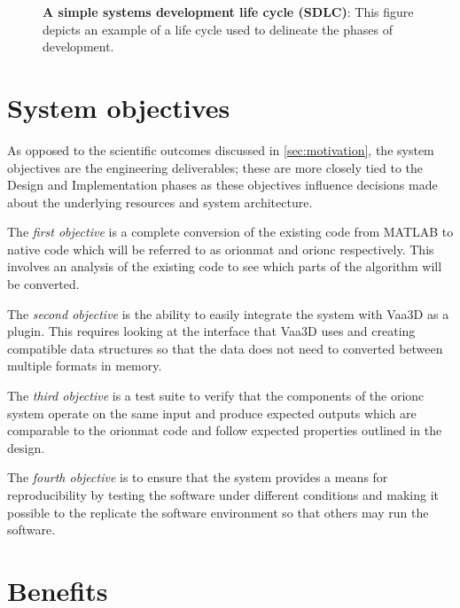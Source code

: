 \begin{figure}[tbp]
\centering

\caption[Systems development life cycle]%
	{\textbf{A simple systems development life cycle (SDLC)}: This figure
	depicts an example of a life cycle used to delineate the
	phases of development.
}\label{fig:sdlc}
\end{figure}

\section{System objectives}\label{sec:objectives}

As opposed to the scientific outcomes discussed in \cref{sec:motivation},
the system objectives are the engineering
deliverables; these are more closely tied to the Design and Implementation
phases as these objectives influence decisions made about the underlying
resources and system architecture.

The \emph{first objective} is a complete conversion of the
existing code from MATLAB to native code which will be referred to
as \gls{orionmat} and \gls{orionc} respectively. This involves an
analysis of the existing code to see which parts of the algorithm will be converted.

The \emph{second objective} is the ability to easily integrate the system with
Vaa3D as a plugin. This requires looking at the interface that
Vaa3D uses and creating compatible data structures so that the
data does not need to converted between multiple formats in
memory.

The \emph{third objective} is a test suite to verify that the
components of the \gls{orionc} system operate on the same input
and produce expected outputs which are comparable to the
\gls{orionmat} code and follow expected properties outlined in the
design.

The \emph{fourth objective} is to ensure that the system provides
a means for reproducibility by testing the software under different
conditions and making it possible to the replicate the software
environment so that others may run the software.

\section{Benefits}\label{sec:benefits}

